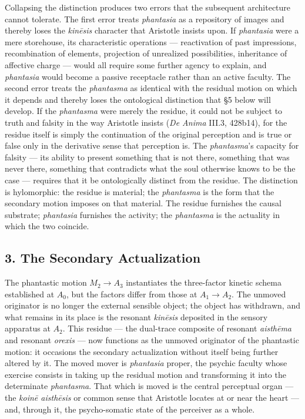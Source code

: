 \documentclass[12pt]{article}
\begin{document}
Collapsing the distinction produces two errors that the subsequent architecture cannot tolerate. The first error treats \textit{phantasia} as a repository of images and thereby loses the \textit{kinēsis} character that Aristotle insists upon. If \textit{phantasia} were a mere storehouse, its characteristic operations --- reactivation of past impressions, recombination of elements, projection of unrealized possibilities, inheritance of affective charge --- would all require some further agency to explain, and \textit{phantasia} would become a passive receptacle rather than an active faculty. The second error treats the \textit{phantasma} as identical with the residual motion on which it depends and thereby loses the ontological distinction that §5 below will develop. If the \textit{phantasma} were merely the residue, it could not be subject to truth and falsity in the way Aristotle insists (\textit{De Anima} III.3, 428b14), for the residue itself is simply the continuation of the original perception and is true or false only in the derivative sense that perception is. The \textit{phantasma}'s capacity for falsity --- its ability to present something that is not there, something that was never there, something that contradicts what the soul otherwise knows to be the case --- requires that it be ontologically distinct from the residue. The distinction is hylomorphic: the residue is material; the \textit{phantasma} is the form that the secondary motion imposes on that material. The residue furnishes the causal substrate; \textit{phantasia} furnishes the activity; the \textit{phantasma} is the actuality in which the two coincide.

\subsection*{3. The Secondary Actualization}

The phantastic motion $M_2$$\to$$A_3$ instantiates the three-factor kinetic schema established at $A_0$, but the factors differ from those at $A_1$$\to$$A_2$. The unmoved originator is no longer the external sensible object; the object has withdrawn, and what remains in its place is the resonant \textit{kinēsis} deposited in the sensory apparatus at $A_2$. This residue --- the dual-trace composite of resonant \textit{aisthēma} and resonant \textit{orexis} --- now functions as the unmoved originator of the phantastic motion: it occasions the secondary actualization without itself being further altered by it. The moved mover is \textit{phantasia} proper, the psychic faculty whose exercise consists in taking up the residual motion and transforming it into the determinate \textit{phantasma}. That which is moved is the central perceptual organ --- the \textit{koinē aisthēsis} or common sense that Aristotle locates at or near the heart --- and, through it, the psycho-somatic state of the perceiver as a whole.
\end{document}
